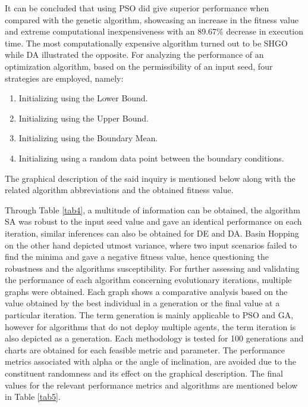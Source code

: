 \documentclass[default,iicol]{sn-jnl}
\theoremstyle{thmstyleone}
\theoremstyle{thmstyletwo}
\theoremstyle{thmstylethree}
\begin{document}
It can be concluded that using PSO did give superior performance when compared with the genetic algorithm, showcasing an increase in the fitness value and extreme computational inexpensiveness with an 89.67\% decrease in execution time. The most computationally expensive algorithm turned out to be SHGO while DA illustrated the opposite. For analyzing the performance of an optimization algorithm, based on the permissibility of an input seed, four strategies are employed, namely:

\begin{enumerate}[1.]
\item Initializing using the Lower Bound.

\item Initializing using the Upper Bound.

\item Initializing using the Boundary Mean.

\item Initializing using a random data point between the boundary conditions. 

\end{enumerate}

The graphical description of the said inquiry is mentioned below along with the related algorithm abbreviations and the obtained fitness value.

Through Table \ref{tab4}, a multitude of information can be obtained, the algorithm SA was robust to the input seed value and gave an identical performance on each iteration, similar inferences can also be obtained for DE and DA. Basin Hopping on the other hand depicted utmost variance, where two input scenarios failed to find the minima and gave a negative fitness value, hence questioning the robustness and the algorithms susceptibility. 
For further assessing and validating the performance of each algorithm concerning evolutionary iterations, multiple graphs were obtained. Each graph shows a comparative analysis based on the value obtained by the best individual in a generation or the final value at a particular iteration. The term generation is mainly applicable to PSO and GA, however for algorithms that do not deploy multiple agents, the term iteration is also depicted as a generation. Each methodology is tested for 100 generations and charts are obtained for each feasible metric and parameter. The performance metrics associated with alpha or the angle of inclination, are avoided due to the constituent randomness and its effect on the graphical description. The final values for the relevant performance metrics and algorithms are mentioned below in Table \ref{tab5}.
\end{document}
